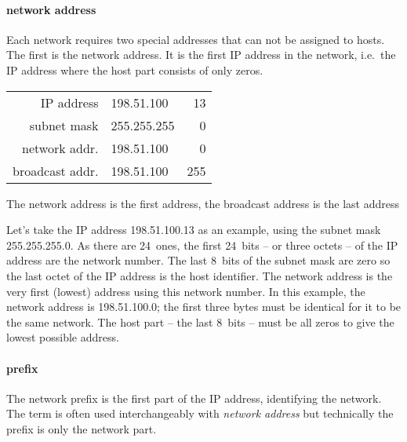 \paragraph{network address}
Each network requires two special addresses that can not be assigned to hosts.
The first is the network address.
It is the first \acs{IP} address in the network, i.e.~the \acs{IP} address where the host part consists of only zeros.

\begin{margintable}
\begin{tabular}{rl@{.}r}
\textcolor{spot5}{\acs{IP} address}  & \textcolor{spot1}{198.51.100}  & 13 \\
\textcolor{spot5}{subnet mask}       & 255.255.255 &  0 \\
\textcolor{spot5}{network addr.}     & \textcolor{spot1}{198.51.100}  & \textcolor{spot2}{0}   \\
\textcolor{spot5}{broadcast addr.}   & \textcolor{spot1}{198.51.100}  & \textcolor{spot2}{255} \\
\end{tabular}
\caption{The network address is the first address, the broadcast address is the last address}
\label{tab:network-broadcast-address}
\end{margintable}

Let's take the \acs{IP} address 198.51.100.13 as an example, using the subnet mask 255.255.255.0.
As there are 24~ones, the first 24~bits -- or three octets -- of the \acs{IP} address are the network number.
The last 8~bits of the subnet mask are zero so the last octet of the \acs{IP} address is the host identifier.
The network address is the very first (lowest) address using this network number.
In this example, the network address is 198.51.100.0; the first three bytes must be identical for it to be the same network.
The host part -- the last 8~bits -- must be all zeros to give the lowest possible address.

\paragraph{prefix}
The network prefix is the first part of the \acs{IP} address, identifying the network.
The term is often used interchangeably with \emph{network address} but technically the prefix is only the network part.


